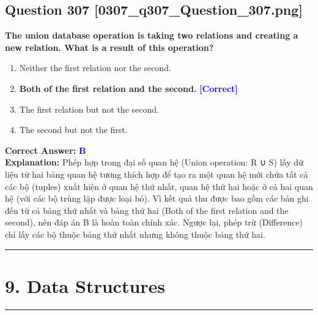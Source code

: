 \documentclass[11pt,a4paper]{article}
\begin{document}
\begin{minipage}{\textwidth}
\subsection*{Question 307 \quad \footnotesize{[0307\_q307\_Question\_307.png]}}
\noindent \textbf{The union database operation is taking two relations and creating a new relation. What is a result of this operation?}

\begin{enumerate}[label=\Alph*.]
    \item Neither the first relation nor the second.
    \item \textbf{Both of the first relation and the second.} \hfill \textcolor{blue}{\textbf{[Correct]}}
    \item The first relation but not the second.
    \item The second but not the first.
\end{enumerate}

\noindent \textbf{Correct Answer:} \textcolor{blue}{\textbf{B}} \\[2pt]
\noindent \textbf{Explanation:} Phép hợp trong đại số quan hệ (Union operation: R ∪ S) lấy dữ liệu từ hai bảng quan hệ tương thích hợp để tạo ra một quan hệ mới chứa tất cả các bộ (tuples) xuất hiện ở quan hệ thứ nhất, quan hệ thứ hai hoặc ở cả hai quan hệ (với các bộ trùng lặp được loại bỏ). Vì kết quả thu được bao gồm các bản ghi đến từ cả bảng thứ nhất và bảng thứ hai (Both of the first relation and the second), nên đáp án B là hoàn toàn chính xác. Ngược lại, phép trừ (Difference) chỉ lấy các bộ thuộc bảng thứ nhất nhưng không thuộc bảng thứ hai.

\par\vspace{0.3cm}
\hrule
\vspace{0.3cm}
\end{minipage}


\newpage
\section*{9. Data Structures}
\hrule\vspace{0.5cm}
\end{document}
